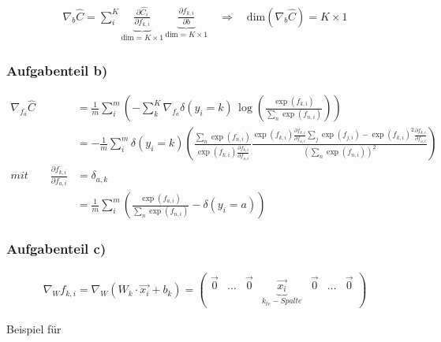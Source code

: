 \documentclass[11pt]{article}
\begin{document}
\[\begin{aligned}
\nabla_b \hat{C} = \sum_i^K \underbrace{\frac{\partial\hat{C_i}}{\partial f_{k,i}}}_{\mathrm{dim} = K\times 1}\,\underbrace{\frac{\partial f_{k,i}}{\partial b}}_{{\mathrm{dim} =  K \times 1}} \quad \Rightarrow \quad \mathrm{dim}(\nabla_b \hat{C}) = K \times 1
\end{aligned}\]

    \hypertarget{aufgabenteil-b}{%
\subsubsection{Aufgabenteil b)}\label{aufgabenteil-b}}

\[\begin{aligned}
\nabla_{f_a} \hat{C} &= \frac{1}{m} \sum_i^m \left(-\sum_k^K\nabla_{f_a} \delta(y_i =k) \,\log\left(\frac{\exp(f_{k,i})}{\sum_n \exp(f_{n,i})}\right)\right) \\
&=  -\frac{1}{m} \sum_i^m \delta(y_i =k)\left( \frac{\sum_n \exp(f_{n,i})}{\exp(f_{k,i})\frac{\partial f_{k,i}}{\partial f_{a,i}}}\frac{\exp(f_{k,i}) \frac{\partial f_{k,i}}{\partial f_{a,i}} \sum_j \exp(f_{j,i}) - \exp(f_{k,i})^2 \frac{\partial f_{k,i}}{\partial f_{a,i}}}{\left(\sum_n \exp(f_{n,i})\right)^2} \right) \\
mit \qquad \frac{\partial f_{k,i}}{\partial f_{a,i}}&=\delta_{a,k} \\
&= \frac{1}{m} \sum_i^m \left( \frac{\exp(f_{a,i})}{\sum_n \exp(f_{n,i})} - \delta(y_i =a)\right)
\end{aligned}\]

    \hypertarget{aufgabenteil-c}{%
\subsubsection{Aufgabenteil c)}\label{aufgabenteil-c}}

\[\begin{aligned}
\nabla_W f_{k,i} = \nabla_W \left(W_k \cdot \vec{x_i} + b_k\right) = \begin{pmatrix} \vec{0} & \dots & \vec{0}& \underbrace{\vec{x_i}}_{k_{te}-Spalte} &\vec{0} & \dots & \vec{0} \end{pmatrix}
\end{aligned}\]

Beispiel für
\end{document}
